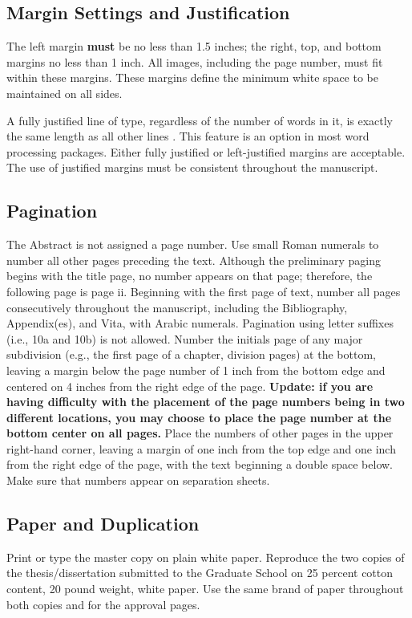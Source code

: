 \subsection{Margin Settings and Justification}
\label{sec:MarginSettingsAndJustification}

The left margin \textbf{must} be no less than 1.5 inches; the right,
top, and bottom margins no less than 1 inch. All images, including the
page number, must fit within these margins. These margins define the
minimum white space to be maintained on all sides.

A fully justified line of type, regardless of the number of words in
it, is exactly the same length as all other lines \cite{chicago1982}.
This feature is an option in most word processing packages. Either
fully justified or left-justified margins are acceptable. The use of
justified margins must be consistent throughout the manuscript.

\subsection{Pagination}
\label{sec:Pagination}

The Abstract is not assigned a page number. Use small Roman numerals
to number all other pages preceding the text. Although the preliminary
paging begins with the title page, no number appears on that page;
therefore, the following page is page ii. Beginning with the first
page of text, number all pages consecutively throughout the
manuscript, including the Bibliography, Appendix(es), and Vita, with
Arabic numerals. Pagination using letter suffixes (i.e., 10a and 10b)
is not allowed. Number the initials page of any major subdivision
(e.g., the first page of a chapter, division pages) at the bottom,
leaving a margin below the page number of 1 inch from the bottom edge
and centered on 4 inches from the right edge of the page.
\textbf{Update: if you are having difficulty with the placement of the
  page numbers being in two different locations, you may choose to
  place the page number at the bottom center on all pages.} Place the
numbers of other pages in the upper right-hand corner, leaving a
margin of one inch from the top edge and one inch from the right edge
of the page, with the text beginning a double space below. Make sure
that numbers appear on separation sheets.

\subsection{Paper and Duplication}
\label{sec:PaperAndDuplication}

Print or type the master copy on plain white paper. Reproduce the two
copies of the the\-sis/dis\-ser\-ta\-tion submitted to the Graduate
School on 25 percent cotton content, 20 pound weight, white paper. Use
the same brand of paper throughout both copies and for the approval
pages.

